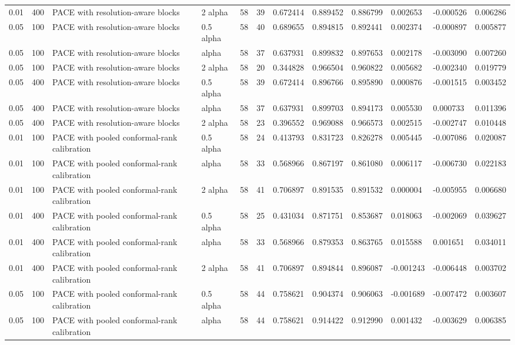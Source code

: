 \begin{tabular}{llllllllllll}
0.01 & 400 & PACE with resolution-aware blocks & 2 alpha & 58 & 39 & 0.672414 & 0.889452 & 0.886799 & 0.002653 & -0.000526 & 0.006286 \\
0.05 & 100 & PACE with resolution-aware blocks & 0.5 alpha & 58 & 40 & 0.689655 & 0.894815 & 0.892441 & 0.002374 & -0.000897 & 0.005877 \\
0.05 & 100 & PACE with resolution-aware blocks & alpha & 58 & 37 & 0.637931 & 0.899832 & 0.897653 & 0.002178 & -0.003090 & 0.007260 \\
0.05 & 100 & PACE with resolution-aware blocks & 2 alpha & 58 & 20 & 0.344828 & 0.966504 & 0.960822 & 0.005682 & -0.002340 & 0.019779 \\
0.05 & 400 & PACE with resolution-aware blocks & 0.5 alpha & 58 & 39 & 0.672414 & 0.896766 & 0.895890 & 0.000876 & -0.001515 & 0.003452 \\
0.05 & 400 & PACE with resolution-aware blocks & alpha & 58 & 37 & 0.637931 & 0.899703 & 0.894173 & 0.005530 & 0.000733 & 0.011396 \\
0.05 & 400 & PACE with resolution-aware blocks & 2 alpha & 58 & 23 & 0.396552 & 0.969088 & 0.966573 & 0.002515 & -0.002747 & 0.010448 \\
0.01 & 100 & PACE with pooled conformal-rank calibration & 0.5 alpha & 58 & 24 & 0.413793 & 0.831723 & 0.826278 & 0.005445 & -0.007086 & 0.020087 \\
0.01 & 100 & PACE with pooled conformal-rank calibration & alpha & 58 & 33 & 0.568966 & 0.867197 & 0.861080 & 0.006117 & -0.006730 & 0.022183 \\
0.01 & 100 & PACE with pooled conformal-rank calibration & 2 alpha & 58 & 41 & 0.706897 & 0.891535 & 0.891532 & 0.000004 & -0.005955 & 0.006680 \\
0.01 & 400 & PACE with pooled conformal-rank calibration & 0.5 alpha & 58 & 25 & 0.431034 & 0.871751 & 0.853687 & 0.018063 & -0.002069 & 0.039627 \\
0.01 & 400 & PACE with pooled conformal-rank calibration & alpha & 58 & 33 & 0.568966 & 0.879353 & 0.863765 & 0.015588 & 0.001651 & 0.034011 \\
0.01 & 400 & PACE with pooled conformal-rank calibration & 2 alpha & 58 & 41 & 0.706897 & 0.894844 & 0.896087 & -0.001243 & -0.006448 & 0.003702 \\
0.05 & 100 & PACE with pooled conformal-rank calibration & 0.5 alpha & 58 & 44 & 0.758621 & 0.904374 & 0.906063 & -0.001689 & -0.007472 & 0.003607 \\
0.05 & 100 & PACE with pooled conformal-rank calibration & alpha & 58 & 44 & 0.758621 & 0.914422 & 0.912990 & 0.001432 & -0.003629 & 0.006385 \\

\end{tabular}
